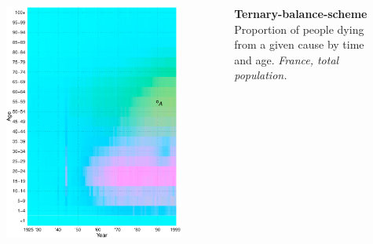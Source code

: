 \documentclass{beamer}
\begin{document}
\begin{frame}
\frametitle{\insertsection}

\begin{columns}[c]

\begin{figure}[htb!]
\includegraphics[width = 0.97\textwidth]{../fig/talk/tern_balance_no_lgnd.pdf}
\end{figure}

\small \textbf{Ternary-balance-scheme}\\ Proportion of people dying from a given cause by time and age. \scriptsize\emph{France, total population.}


\end{columns}
\end{frame}
\end{document}
